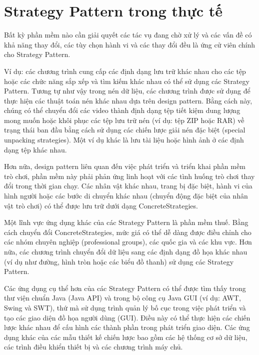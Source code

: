 \section{Strategy Pattern trong thực tế}
Bất kỳ phần mềm nào cần giải quyết các tác vụ đang chờ xử lý và các vấn đề có khả năng thay đổi, các tùy chọn hành vi và các thay đổi đều là ứng cử viên chính cho Strategy Pattern.

Ví dụ: các chương trình cung cấp các định dạng lưu trữ khác nhau cho các tệp hoặc các chức năng sắp xếp và tìm kiếm khác nhau có thể sử dụng các Strategy Pattern. Tương tự như vậy trong nén dữ liệu, các chương trình được sử dụng để thực hiện các thuật toán nén khác nhau dựa trên design pattern. Bằng cách này, chúng có thể chuyển đổi các video thành định dạng tệp tiết kiệm dung lượng mong muốn hoặc khôi phục các tệp lưu trữ nén (ví dụ: tệp ZIP hoặc RAR) về trạng thái ban đầu bằng cách sử dụng các chiến lược giải nén đặc biệt (special unpacking strategies). Một ví dụ khác là lưu tài liệu hoặc hình ảnh ở các định dạng tệp khác nhau.

Hơn nữa, design pattern liên quan đến việc phát triển và triển khai phần mềm trò chơi, phần mềm này phải phản ứng linh hoạt với các tình huống trò chơi thay đổi trong thời gian chạy. Các nhân vật khác nhau, trang bị đặc biệt, hành vi của hình người hoặc các bước di chuyển khác nhau (chuyển động đặc biệt của nhân vật trò chơi) có thể được lưu trữ dưới dạng ConcreteStrategies.

Một lĩnh vực ứng dụng khác của các Strategy Pattern là phần mềm thuế. Bằng cách chuyển đổi ConcreteStrategies, mức giá có thể dễ dàng được điều chỉnh cho các nhóm chuyên nghiệp (professional groups), các quốc gia và các khu vực. Hơn nữa, các chương trình chuyển đổi dữ liệu sang các định dạng đồ họa khác nhau (ví dụ như đường, hình tròn hoặc các biểu đồ thanh) sử dụng các Strategy Pattern.

Các ứng dụng cụ thể hơn của các Strategy Pattern có thể được tìm thấy trong thư viện chuẩn Java (Java API) và trong bộ công cụ Java GUI (ví dụ: AWT, Swing và SWT), thứ mà sử dụng trình quản lý bố cục trong việc phát triển và tạo các giao diện đồ họa người dùng (GUI). Điều này có thể thực hiện các chiến lược khác nhau để cấu hình các thành phần trong phát triển giao diện. Các ứng dụng khác của các mẫu thiết kế chiến lược bao gồm các hệ thống cơ sở dữ liệu, các trình điều khiển thiết bị và các chương trình máy chủ.
